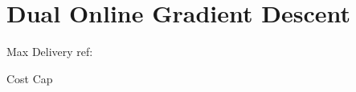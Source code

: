 \documentclass[../main.tex]{subfiles}
\begin{document}
	\chapter{Dual Online Gradient Descent}
	
	
	\begin{section}{Max Delivery}
		ref:  \cite{balseiro2020dual} \cite{balseiro2019learning} \cite{gao2022bidding}
	\end{section}

	\begin{section}{Cost Cap}
		 \cite{gao2022bidding}
	\end{section}
	
\end{document}
